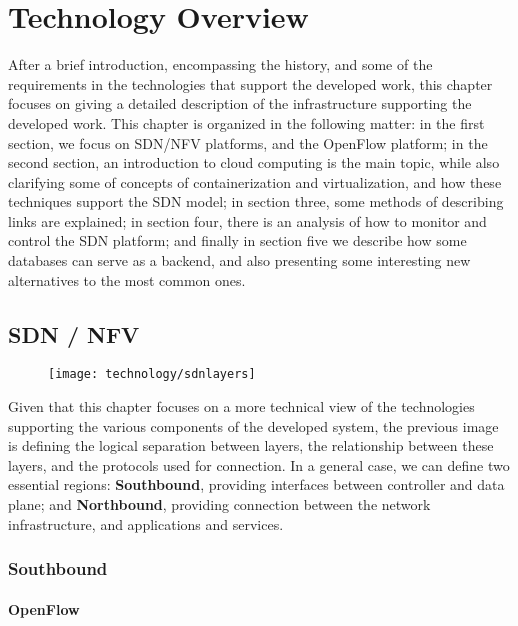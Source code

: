 \chapter{Technology Overview} \label{chap:tech} %
\hspace {5mm}

After a brief introduction, encompassing the history, and some of the requirements in the technologies that support the developed work, this chapter focuses on giving a detailed description of the infrastructure supporting 
the developed work. This chapter is organized in the following matter: in the first section, we focus on SDN/NFV platforms, and the OpenFlow platform; in the second section, an introduction to cloud computing is the main topic,
while also clarifying some of concepts of containerization and virtualization, and how these techniques support the SDN model; in section three, some methods of describing links are explained; in section four, there is an 
analysis of how to monitor and control the SDN platform; and finally in section five we describe how some databases can serve as a backend, and also presenting some interesting new alternatives to the most common ones.

\section {SDN / NFV}

\begin{figure}[!tbph]
  \centering
  {\texttt{[image: technology/sdnlayers]}\label{fig:net_trad}}
\end{figure}

Given that this chapter focuses on a more technical view of the technologies supporting the various components of the developed system, the previous image is defining the logical separation between layers, the relationship between 
these layers, and the protocols used for connection. In a general case, we can define two essential regions: \textbf{Southbound}, 
providing interfaces between controller and data plane; and \textbf{Northbound}, providing connection between the network infrastructure, and applications and services.

\subsection {Southbound}
\subsubsection {OpenFlow}

